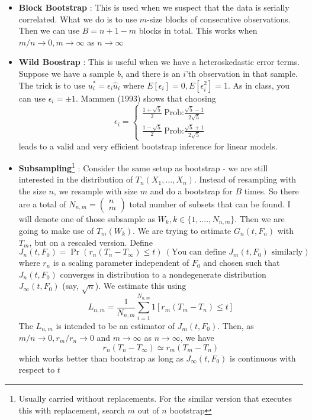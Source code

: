 \documentclass[12pt]{article}
\theoremstyle{definition}
\theoremstyle{property}
\theoremstyle{assumption}
\theoremstyle{example}
\theoremstyle{comment}
\begin{document}
\begin{itemize}
\item \textbf{Block Bootstrap} : This is used when we suspect that the data is serially correlated. What we do is to use $m$-size blocks of consecutive observations. Then we can use $B=n+1-m$ blocks in total. This works when $m/n\to0, m\to\infty$ as $n\to\infty$
\item \textbf{Wild Boostrap} : This is useful when we have a heteroskedastic error terms. Suppose we have a sample $b$, and there is an $i$'th observation in that sample. The trick is to use $u_i^*= \epsilon_i\hat{u}_i$ where $E[\epsilon_i]=0, E[\epsilon_i^2]=1$. As in class, you can use $\epsilon_i = \pm 1$. Mammen (1993) shows that choosing 
\[
\epsilon_i = \begin{cases} \frac{1+\sqrt{5}}{2} \ \text{Prob:} \frac{\sqrt{5}-1}{2\sqrt{5}} \\ \frac{1-\sqrt{5}}{2} \ \text{Prob:} \frac{\sqrt{5}+1}{2\sqrt{5}}\end{cases}
\]
leads to a valid and very efficient bootstrap inference for linear models. 
\item \textbf{Subsampling}\footnote{Usually carried without replacements. For the similar version that executes this with replacement, search $m$ out of $n$ bootstrap} : Consider the same setup as bootstrap - we are still interested in the distribution of $T_n(X_1,...,X_n)$. Instead of resampling with the size $n$, we resample with size $m$ and do a bootstrap for $B$ times. So there are a total of $N_{n,m}=\begin{pmatrix} n \\ m \end{pmatrix}$ total number of subsets that can be found. I will denote one of those subsample as $W_k, k\in\{1,....,N_{n,m}\}$. Then we are going to make use of $T_m(W_k)$. We are trying to estimate $G_n(t, F_n)$ with $T_m$, but on a rescaled version. Define
\[
J_n(t,F_0)=\Pr(r_n(T_n-T_\infty)\leq t) \ (\text{You can define $J_m(t,F_0)$ similarly})
\]
where $r_n$ is a scaling parameter independent of $F_0$ and chosen such that $J_n(t,F_0)$ converges in distribution to a nondegenerate distribution $J_\infty (t,F_0)$ (say, $\sqrt{n}$). We estimate this using
\[
L_{n,m}=\frac{1}{N_{n,m}}\sum_{i=1}^{N_{n,m}}1[r_m(T_m-T_n)\leq t]
\]
The $L_{n,m}$ is intended to be an estimator of $J_m(t,F_0)$. Then, as $m/n\to0, r_m/r_n\to0$ and $m\to\infty$ as $n\to\infty$, we have 
\[
r_n(T_n-T_\infty) \simeq r_m(T_m-T_n)
\]
which works better than bootstrap as long as $J_\infty (t,F_0)$ is continuous with respect to $t$
\end{itemize}
\end{document}
